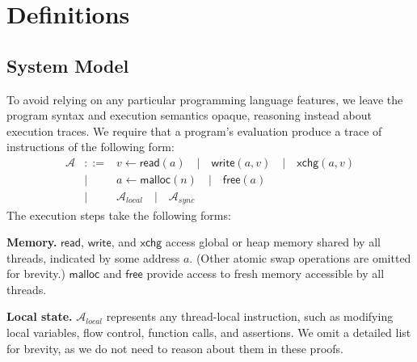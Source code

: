 \section{Definitions}

\subsection{System Model}

To avoid relying on any particular programming language features,
we leave the program syntax and execution semantics opaque,
reasoning instead about execution traces.
We require that a program's evaluation produce a trace of instructions of the following form:
\begin{eqnarray*}
	\mathcal{A} &::=& v \leftarrow \mathsf{read}(a) \quad | \quad \mathsf{write}(a,v) \quad | \quad \mathsf{xchg}(a,v) \\
		&|& a \leftarrow \mathsf{malloc}(n) \quad | \quad \mathsf{free}(a) \\
		&|& \mathcal{A}_{local} \quad | \quad \mathcal{A}_{sync}
\end{eqnarray*}
The execution steps take the following forms:

{\bf Memory.}
$\mathsf{read}$, $\mathsf{write}$, and $\mathsf{xchg}$ access global or heap memory shared by all threads, indicated by some address $a$.
(Other atomic swap operations are omitted for brevity.)
$\mathsf{malloc}$ and $\mathsf{free}$ provide access to fresh memory accessible by all threads. %

{\bf Local state.}
$\mathcal{A}_{local}$ represents any thread-local instruction, such as modifying local variables, flow control, function calls, and assertions. %
We omit a detailed list for brevity, as we do not need to reason about them in these proofs.

